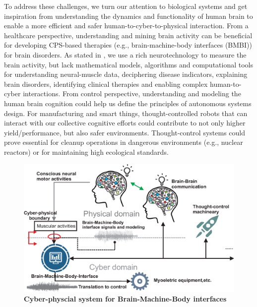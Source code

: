 To address these challenges, we turn our attention to biological systems and get inspiration from understanding the dynamics and functionality of human brain to enable a more efficient and safer human-to-cyber-to-physical interaction. From a healthcare perspective, understanding and mining brain activity can be beneficial for developing CPS-based therapies (e.g., brain-machine-body interfaces (BMBI)) for brain disorders. As stated in \cite{He}, we use a rich neurotechnology to measure the brain activity, but lack mathematical models, algorithms and computational tools for understanding neural-muscle data, deciphering disease indicators, explaining brain disorders, identifying clinical therapies and enabling complex human-to-cyber interactions. From control perspective, understanding and modeling the human brain cognition could help us define the principles of autonomous systems design. For manufacturing and smart things, thought-controlled robots that can interact with our collective cognitive efforts could contribute to not only higher yield/performance, but also safer environments. Thought-control systems could prove essential for cleanup operations in dangerous environments (e.g., nuclear reactors) or for maintaining high ecological standards.\\
\begin{figure}%
\centering
\includegraphics[width=0.94\columnwidth]{brain-brain-interface.eps}
\vspace{-3mm}
\caption{\textbf{Cyber-physcial system for Brain-Machine-Body interfaces}}\label{fig:BMBI}
\vspace{-7mm}
\end{figure}
